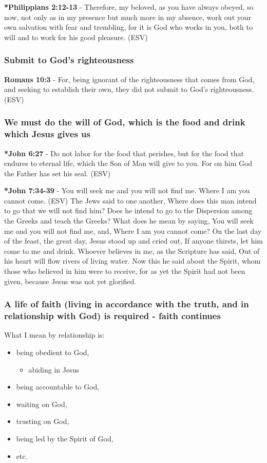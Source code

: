 \documentclass[11pt]{article}
\begin{document}
\textbf{*Philippians 2:12-13} - Therefore, my beloved, as you have always obeyed, so now, not only as in my presence but much more in my absence, work out your own salvation with fear and trembling, for it is God who works in you, both to will and to work for his good pleasure. (ESV)

\subsubsection{Submit to God's righteousness}
\label{sec:org1d5498a}
\textbf{Romans 10:3} - For, being ignorant of the righteousness that comes from God, and seeking to establish their own, they did not submit to God's righteousness. (ESV)

\subsubsection{We must do the will of God, which is the food and drink which Jesus gives us}
\label{sec:org52d2724}
\textbf{*John 6:27} - Do not labor for the food that perishes, but for the food that endures to eternal life, which the Son of Man will give to you. For on him God the Father has set his seal. (ESV)

\textbf{*John 7:34-39} - You will seek me and you will not find me. Where I am you cannot come. (ESV) The Jews said to one another, Where does this man intend to go that we will not find him? Does he intend to go to the Dispersion among the Greeks and teach the Greeks?  What does he mean by saying, You will seek me and you will not find me, and, Where I am you cannot come?  On the last day of the feast, the great day, Jesus stood up and cried out, If anyone thirsts, let him come to me and drink.  Whoever believes in me, as the Scripture has said, Out of his heart will flow rivers of living water.  Now this he said about the Spirit, whom those who believed in him were to receive, for as yet the Spirit had not been given, because Jesus was not yet glorified.

\subsubsection{A life of faith (living in accordance with the truth, and in relationship with God) is required - faith continues}
\label{sec:orgc2e0dc0}
What I mean by relationship is:
\begin{itemize}
\item being obedient to God,
\begin{itemize}
\item abiding in Jesus
\end{itemize}
\item being accountable to God,
\item waiting on God,
\item trusting on God,
\item being led by the Spirit of God,
\item etc.
\end{itemize}
\end{document}
